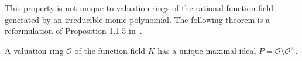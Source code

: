 This property is not unique to valuation rings of the rational function field generated by an irreducible monic polynomial. The following theorem is a reformulation of Proposition 1.1.5 in~\cite{stichtenoth-2009-algebraic-function-fields}.

\begin{theorem}
  A valuation ring \(\mathcal{O}\) of the function field \(K\) has a unique maximal ideal \(P = \mathcal{O} \setminus \mathcal{O}^{\times}\).
\end{theorem}
